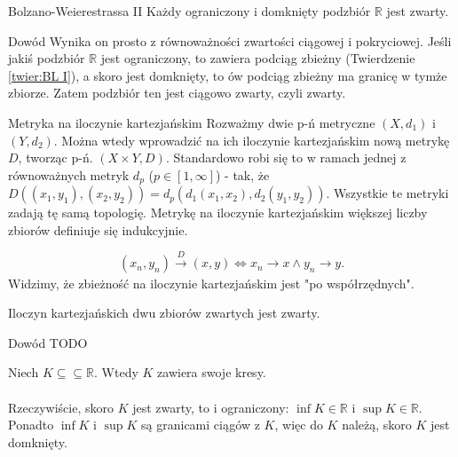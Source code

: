 \documentclass{article}
\newcounter{defi}
\numberwithin{defi}{section}
\numberwithin{defi}{section}
\newcommand{\R}{\mathbb{R}}
\newcommand{\oo}{\infty}
\begin{document}
    \begin{twier}{Bolzano-Weierestrassa II} \label{twier:BL II}
        Każdy ograniczony i domknięty podzbiór $\R$ jest zwarty.
    \end{twier}

    \begin{dow}{Dowód}
        Wynika on prosto z równoważności zwartości ciągowej i pokryciowej. Jeśli jakiś podzbiór $\R$ jest ograniczony, to zawiera podciąg zbieżny (Twierdzenie \ref{twier:BL I}), a skoro jest domknięty, to ów podciąg zbieżny ma granicę w tymże zbiorze. Zatem podzbiór ten jest ciągowo zwarty, czyli zwarty.
    \end{dow}


    \begin{defr}{Metryka na iloczynie kartezjańskim}
        Rozważmy dwie p-ń metryczne $(X, d_1)$ i $(Y, d_2)$. Można wtedy wprowadzić na ich iloczynie kartezjańskim nową metrykę $D$, tworząc p-ń. $(X \times Y, D)$. Standardowo robi się to w ramach jednej z równoważnych metryk $d_p$ ($p \in [1, \oo]$) - tak, że $D((x_1, y_1), (x_2, y_2)) = d_p(d_1(x_1, x_2), d_2(y_1, y_2))$. Wszystkie te metryki zadają tę samą topologię. Metrykę na iloczynie kartezjańskim większej liczby zbiorów definiuje się indukcyjnie.
    \end{defr}
    \begin{obs}{}
        \begin{equation}
            (x_n, y_n) \xrightarrow[]{D} (x, y) \iff x_n \to x \wedge y_n \to y.
        \end{equation} Widzimy, że zbieżność na iloczynie kartezjańskim jest "po współrzędnych".
    \end{obs}

    \begin{twier}{} \label{twier:il-kart-zwar}
        Iloczyn kartezjańskich dwu zbiorów zwartych jest zwarty.
    \end{twier}

    \begin{dow}{Dowód}
        TODO
    \end{dow}


    \begin{obs}{} \label{obs:zwar-kres}
        Niech $K \subseteq \subseteq \R$. Wtedy $K$ zawiera swoje kresy. 
    \end{obs}
    \paragraph{} Rzeczywiście, skoro $K$ jest zwarty, to i ograniczony: $\inf K \in \R$ i $\sup K \in \R$. Ponadto $\inf K$ i $\sup K$ są granicami ciągów z $K$, więc do $K$ należą, skoro $K$ jest domknięty.
\end{document}
